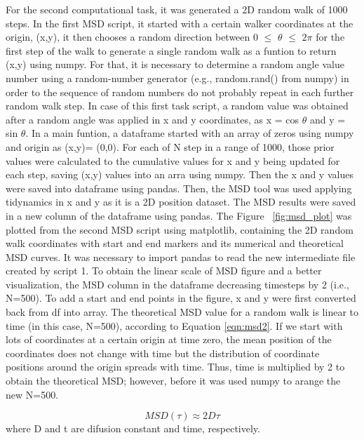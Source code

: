 \documentclass{article}
\begin{document}
For the second computational task, it was generated a 2D random walk of 1000 steps. In the first MSD script, it started with a certain walker coordinates at the origin, (x,y), it then chooses a random direction between 0 $\leq$ $\theta$ $\leq$ $2\pi$ for the first step of the walk to generate a single random walk as a funtion to return (x,y) using numpy. For that, it is necessary to determine a random angle value number using a random-number generator (e.g., random.rand() from numpy) in order to the sequence of random numbers do not probably repeat in each further random walk step. In case of this first task script, a random value was obtained after a random angle was applied in x and y coordinates, as x = cos $\theta$ and y = sin $\theta$. In a main funtion, a dataframe started with an array of zeros using numpy and origin as (x,y)= (0,0). For each of N step in a range of 1000, those prior values were calculated to the cumulative values for x and y being updated for each step, saving (x,y) values into an arra using numpy. Then the x and y values were saved into dataframe using pandas. Then, the MSD tool was used applying tidynamics in x and y as it is a 2D position dataset. The MSD results were saved in a new column of the dataframe using pandas. The Figure ~\ref{fig:msd_plot} was plotted from the second MSD script using matplotlib, containing the 2D random walk coordinates with start and end markers and its numerical and theoretical MSD curves. It was necessary to import pandas to read the new intermediate file created by script 1. To obtain the linear scale of MSD figure and a better visualization, the MSD column in the dataframe decreasing timesteps by 2 (i.e., N=500). To add a start and end points in the figure, x and y were first converted back from df into array. The theoretical MSD value for a random walk is linear to time (in this case, N=500), according to Equation \ref{eqn:msd2}. If we start with lots of coordinates at a certain origin at time zero, the mean position of the coordinates does not change with time but the distribution of coordinate positions around the origin spreads with time. Thus, time is multiplied by 2 to obtain the theoretical MSD; however, before it was used numpy to arange the new N=500.

\begin{equation}
MSD(\tau) \approx 2 D \tau
\label{eqn:msd2}
\end{equation}
where D and t are difusion constant and time, respectively.
\end{document}
